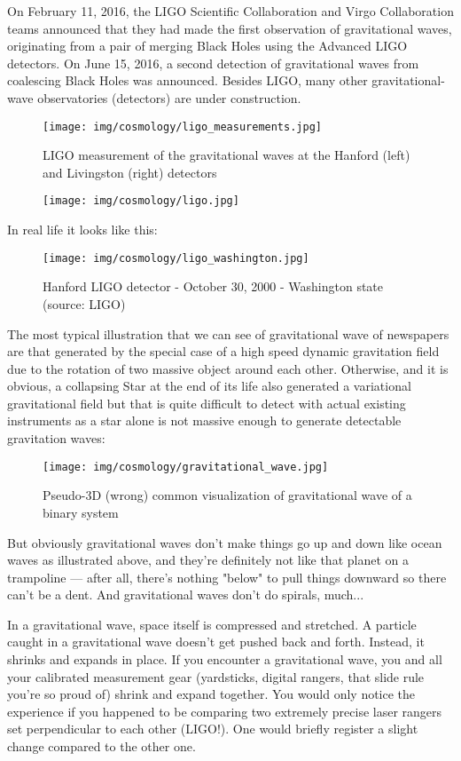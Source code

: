 	On February 11, 2016, the LIGO Scientific Collaboration and Virgo Collaboration teams announced that they had made the first observation of gravitational waves, originating from a pair of merging Black Holes using the Advanced LIGO detectors. On June 15, 2016, a second detection of gravitational waves from coalescing Black Holes was announced. Besides LIGO, many other gravitational-wave observatories (detectors) are under construction.
	\begin{figure}[H]
		\centering
		\texttt{[image: img/cosmology/ligo\_measurements.jpg]}	
		\caption[LIGO measurement of the gravitational waves at the Hanford and Livingston detectors]{LIGO measurement of the gravitational waves at the Hanford (left) and Livingston (right) detectors}
	\end{figure}
	\begin{figure}[H]
		\centering
		\texttt{[image: img/cosmology/ligo.jpg]}
	\end{figure}
	In real life it looks like this:
	\begin{figure}[H]
		\centering
		\texttt{[image: img/cosmology/ligo\_washington.jpg]}
		\caption[Hanford LIGO detector Washington state]{Hanford LIGO detector - October 30, 2000 - Washington state (source: LIGO)}
	\end{figure}
	The most typical illustration that we can see of gravitational wave of newspapers are that generated by the special case of a high speed dynamic gravitation field due to the rotation of two massive object around each other. Otherwise, and it is obvious, a collapsing Star at the end of its life also generated a variational gravitational field but that is quite difficult to detect with actual existing instruments as a star alone is not massive enough to generate detectable gravitation waves:
	\begin{figure}[H]
		\centering
		\texttt{[image: img/cosmology/gravitational\_wave.jpg]}	
		\caption{Pseudo-3D (wrong) common visualization of gravitational wave of a binary system}
	\end{figure}
	But obviously gravitational waves don't make things go up and down like ocean waves as illustrated above, and they're definitely not like that planet on a trampoline — after all, there's nothing "below" to pull things downward so there can't be a dent.  And gravitational waves don't do spirals, much...
	
	In a gravitational wave, space itself is compressed and stretched.  A particle caught in a gravitational wave doesn't get pushed back and forth.  Instead, it shrinks and expands in place. If you encounter a gravitational wave, you and all your calibrated measurement gear (yardsticks, digital rangers, that slide rule you're so proud of) shrink and expand together.  You would only notice the experience if you happened to be comparing two extremely precise laser rangers set perpendicular to each other (LIGO!).  One would briefly register a slight change compared to the other one.
	
